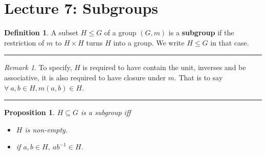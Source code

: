 \documentclass{article}
\newtheorem{theorem}{Proposition}[section]
\theoremstyle{definition}
\newtheorem{definition}{Definition}[section]
\theoremstyle{remark}
\newtheorem*{remark}{Remark}
\begin{document}
\section{Lecture 7: Subgroups}
\begin{definition}
	A subset $H\leq G$ of a group $(G,m)$ is a \textbf{subgroup} if the restriction of $m$ to $H\times H$ turns $H$ into a group. We write $H\leq  G$ in that case.\\
\end{definition}
\hrule
\vspace{2mm}
\begin{remark}
	To specify, $H$ is required to have contain the unit, inverses and be associative, it is also required to have closure under $m$. That is to say $\forall ~a,b\in H,m(a,b)\in H$.\\
\end{remark}
\hrule
\begin{theorem}
	$H\subseteq G$ is a subgroup iff
	\begin{itemize}
		\item $H$ is non-empty.
		\item if $a,b\in H$, $ab^{-1}\in H$.
	\end{itemize}
\end{theorem}
\end{document}
